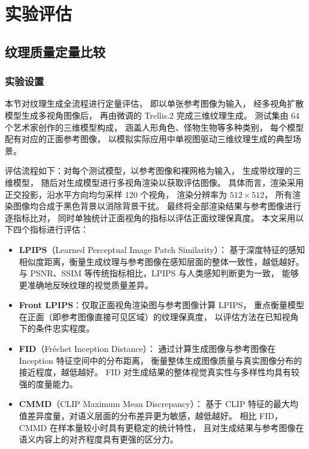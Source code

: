 \cleardoublepage

\section{实验评估}

\subsection{纹理质量定量比较}

\subsubsection{实验设置}

本节对纹理生成全流程进行定量评估，
即以单张参考图像为输入，
经多视角扩散模型生成多视角图像后，
再由微调的 Trellis.2 完成三维纹理生成。
测试集由 64 个艺术家创作的三维模型构成，
涵盖人形角色、怪物生物等多种类别，
每个模型配有对应的正面参考图像，
以模拟实际应用中单视图驱动三维纹理生成的典型场景。

评估流程如下：对每个测试模型，以参考图像和裸网格为输入，
生成带纹理的三维模型，
随后对生成模型进行多视角渲染以获取评估图像。
具体而言，渲染采用正交投影，沿水平方向均匀采样 120 个视角，
渲染分辨率为 $512 \times 512$，
所有渲染图像均合成于黑色背景以消除背景干扰。
最终将全部渲染结果与参考图像进行逐指标比对，
同时单独统计正面视角的指标以评估正面纹理保真度。
本文采用以下四个指标进行评估：

\begin{itemize}
    \item \textbf{LPIPS}（Learned Perceptual Image Patch Similarity）\cite{zhang2018unreasonable}：
    基于深度特征的感知相似度距离，衡量生成纹理与参考图像在感知层面的整体一致性，越低越好。
    与 PSNR、SSIM 等传统指标相比，LPIPS 与人类感知判断更为一致，
    能够更准确地反映纹理的视觉质量差异。
    \item \textbf{Front LPIPS}：仅取正面视角渲染图与参考图像计算 LPIPS，
    重点衡量模型在正面（即参考图像直接可见区域）的纹理保真度，
    以评估方法在已知视角下的条件忠实程度。
    \item \textbf{FID}（Fréchet Inception Distance）\cite{heusel2017gans}：
    通过计算生成图像与参考图像在 Inception 特征空间中的分布距离，
    衡量整体生成图像质量与真实图像分布的接近程度，越低越好。
    FID 对生成结果的整体视觉真实性与多样性均具有较强的度量能力。
    \item \textbf{CMMD}（CLIP Maximum Mean Discrepancy）\cite{jayasumana2024rethinking}：
    基于 CLIP 特征的最大均值差异度量，对语义层面的分布差异更为敏感，越低越好。
    相比 FID，CMMD 在样本量较小时具有更稳定的统计特性，
    且对生成结果与参考图像在语义内容上的对齐程度具有更强的区分力。
\end{itemize}

